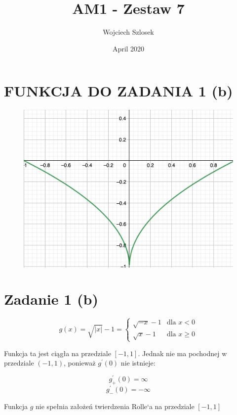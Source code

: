 \documentclass{article}
\title{AM1 - Zestaw 7}
\author{Wojciech Szlosek}
\date{April 2020}
\begin{document}
\section{FUNKCJA DO ZADANIA 1 (b)}
\begin{figure} 
\includegraphics {funkcja.png} \end{figure} \newline \newline

\maketitle

\section{Zadanie 1 (b)}

$$g(x) = \sqrt{|x|} - 1 =\left\{ \begin{array}{rl}
\sqrt{-x}-1 & \textrm{dla $x<0$} \\ \sqrt{x}-1 & \textrm{dla $x\geq0$} \end{array}$$
\newline

Funkcja ta jest ciągła na przedziale $[-1,1]$. Jednak nie ma pochodnej w przedziale $(-1,1)$, ponieważ $g^{'}(0)$ nie istnieje: \newline

$$g^{'}_{+}(0) = \infty$$
$$g^{'}_{-}(0) = -\infty$$ \newline

Funkcja $g$ nie spełnia założeń twierdzenia Rolle`a na przedziale $[-1,1]$ \newline
\end{document}
